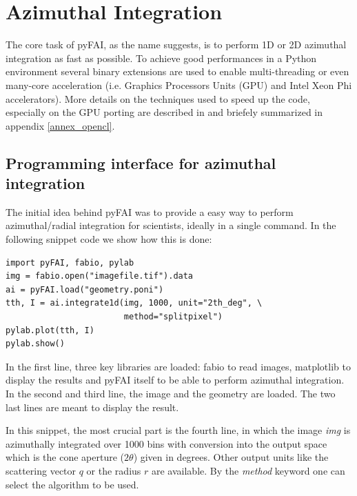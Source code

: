 \documentclass{iucr}
\begin{document}
\section{Azimuthal Integration}

The core task of pyFAI, as the name suggests, is to perform 1D or 2D azimuthal
integration as fast as possible. To achieve good performances in a Python environment
several binary extensions are used to enable multi-threading or even many-core
acceleration (i.e. Graphics Processors Units (GPU) and Intel Xeon Phi
accelerators).
More details on the techniques used to speed up the code, especially on the GPU porting
are described in \cite{kieffer_ashiotis-proc-euroscipy-2014} and briefely
summarized in appendix \ref{annex_opencl}.

\subsection{Programming interface for azimuthal integration}

The initial idea behind pyFAI was to provide a easy way to perform
azimuthal/radial integration for scientists, ideally in a single command.
In the following snippet code we show how this is done:

\begin{verbatim}
import pyFAI, fabio, pylab
img = fabio.open("imagefile.tif").data
ai = pyFAI.load("geometry.poni")
tth, I = ai.integrate1d(img, 1000, unit="2th_deg", \
                        method="splitpixel")
pylab.plot(tth, I)
pylab.show()
\end{verbatim}

In the first line, three key libraries are loaded: fabio \cite{fabio} to read
images, matplotlib \cite{matplotlib} to display the results and pyFAI itself to
be able to perform azimuthal integration.
In the second and third line,  the image and the geometry are loaded.
The two last lines are meant to display the result.

In this snippet, the most crucial part is the fourth line, in which the image
\textit{img} is azimuthally integrated over 1000 bins with conversion  into
the output space which is the cone aperture ($2\theta$) given in degrees.
Other output units like the scattering vector $q$ or the radius $r$ are
available. By the \textit{method} keyword one can select the
algorithm to be used.
\end{document}
